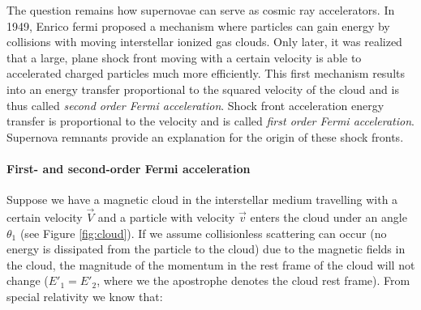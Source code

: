 The question remains how supernovae can serve as cosmic ray accelerators. In 1949, Enrico fermi proposed a mechanism where particles can gain energy by collisions with moving interstellar ionized gas clouds. Only later, it was realized that a large, plane shock front moving with a certain velocity is able to accelerated charged particles much more efficiently. This first mechanism results into an energy transfer proportional to the squared velocity of the cloud and is thus called \textit{second order Fermi acceleration}. Shock front acceleration energy transfer is proportional to the velocity and is called \textit{first order Fermi acceleration}. Supernova remnants provide an explanation for the origin of these shock fronts.

\paragraph{First- and second-order Fermi acceleration}
\label{para:fermiacceleration}

Suppose we have a magnetic cloud in the interstellar medium travelling with a certain velocity $\vec{V}$ and a particle with velocity $\vec{v}$ enters the cloud under an angle $\theta_1$ (see Figure \ref{fig:cloud}). If we assume collisionless scattering can occur (no energy is dissipated from the particle to the cloud) due to the magnetic fields in the cloud, the magnitude of the momentum in the rest frame of the cloud will not change ($E'_1 = E'_2$, where we the apostrophe denotes the cloud rest frame). From special relativity we know that:


